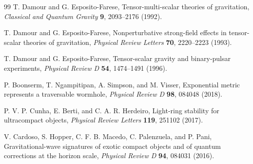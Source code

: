 \documentclass[12pt,a4paper]{article}
\begin{document}
\begin{thebibliography}{99}
T. Damour and G. Esposito-Farese, Tensor-multi-scalar theories of gravitation, \textit{Classical and Quantum Gravity} \textbf{9}, 2093--2176 (1992).

T. Damour and G. Esposito-Farese, Nonperturbative strong-field effects in tensor-scalar theories of gravitation, \textit{Physical Review Letters} \textbf{70}, 2220--2223 (1993).

T. Damour and G. Esposito-Farese, Tensor-scalar gravity and binary-pulsar experiments, \textit{Physical Review D} \textbf{54}, 1474--1491 (1996).

P. Boonserm, T. Ngampitipan, A. Simpson, and M. Visser, Exponential metric represents a traversable wormhole, \textit{Physical Review D} \textbf{98}, 084048 (2018).

P. V. P. Cunha, E. Berti, and C. A. R. Herdeiro, Light-ring stability for ultracompact objects, \textit{Physical Review Letters} \textbf{119}, 251102 (2017).

V. Cardoso, S. Hopper, C. F. B. Macedo, C. Palenzuela, and P. Pani, Gravitational-wave signatures of exotic compact objects and of quantum corrections at the horizon scale, \textit{Physical Review D} \textbf{94}, 084031 (2016).

\end{thebibliography}
\end{document}
